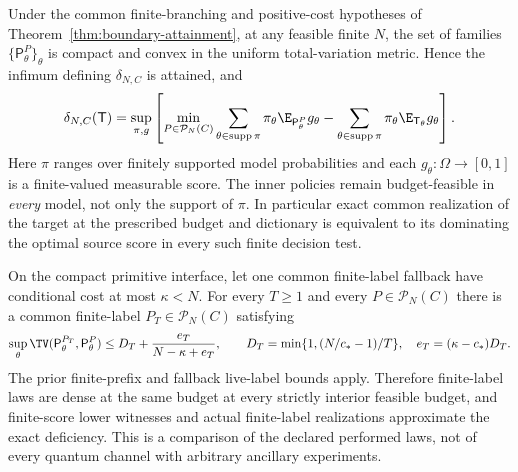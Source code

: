 \begin{theorem}\label{thm:complete-stopped-order}
Under the common finite-branching and positive-cost hypotheses of Theorem~\ref{thm:boundary-attainment}, at any feasible finite $N$, the set of families $\{\mathsf P_\theta^P\}_\theta$ is compact and convex in the uniform total-variation metric. Hence the infimum defining $\delta_{N,C}$ is attained, and
\begin{equation}\label{eq:complete-stopped-dual}
 \delta_{N,C}(\mathsf T)
 =\sup_{\pi,g}\left[
 \min_{P\in\mathcal P_N(C)}\sum_{\theta\in\operatorname{supp}\pi}
           \pi_\theta\E_{\mathsf P_\theta^P}g_\theta
 -\sum_{\theta\in\operatorname{supp}\pi}
           \pi_\theta\E_{\mathsf T_\theta}g_\theta\right].
\end{equation}
Here $\pi$ ranges over finitely supported model probabilities and each $g_\theta:\Omega\to[0,1]$ is a finite-valued measurable score. The inner policies remain budget-feasible in \emph{every} model, not only the support of $\pi$. In particular exact common realization of the target at the prescribed budget and dictionary is equivalent to its dominating the optimal source score in every such finite decision test.

On the compact primitive interface, let one common finite-label fallback have conditional cost at most $\kappa<N$. For every $T\ge1$ and every $P\in\mathcal P_N(C)$ there is a common finite-label $P_T\in\mathcal P_N(C)$ satisfying
\begin{equation}\label{eq:stopped-law-density}
 \sup_\theta\TV(\mathsf P_\theta^{P_T},\mathsf P_\theta^P)
 \le D_T+\frac{e_T}{N-\kappa+e_T},\qquad
 D_T=\min\{1,(N/c_*-1)/T\},\quad e_T=(\kappa-c_*)D_T.
\end{equation}
The prior finite-prefix and fallback live-label bounds apply. Therefore finite-label laws are dense at the same budget at every strictly interior feasible budget, and finite-score lower witnesses and actual finite-label realizations approximate the exact deficiency. This is a comparison of the declared performed laws, not of every quantum channel with arbitrary ancillary experiments.
\end{theorem}

